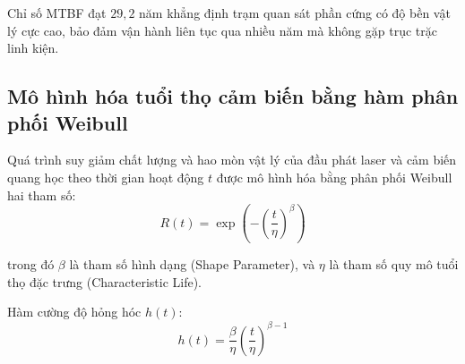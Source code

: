 Chỉ số MTBF đạt $29{,}2$ năm khẳng định trạm quan sát phần cứng có độ bền vật lý cực cao, bảo đảm vận hành liên tục qua nhiều năm mà không gặp trục trặc linh kiện.

\subsection{Mô hình hóa tuổi thọ cảm biến bằng hàm phân phối Weibull}

\hspace{0.5cm} Quá trình suy giảm chất lượng và hao mòn vật lý của đầu phát laser và cảm biến quang học theo thời gian hoạt động $t$ được mô hình hóa bằng phân phối Weibull hai tham số:
\begin{equation}
R(t) = \exp\left( - \left( \frac{t}{\eta} \right)^\beta \right)
\label{eq:weibull-reliability-formula}
\end{equation}

trong đó $\beta$ là tham số hình dạng (Shape Parameter), và $\eta$ là tham số quy mô tuổi thọ đặc trưng (Characteristic Life).

Hàm cường độ hỏng hóc $h(t)$:
\begin{equation}
h(t) = \frac{\beta}{\eta} \left( \frac{t}{\eta} \right)^{\beta - 1}
\label{eq:weibull-hazard-rate-formula}
\end{equation}

\begin{table}[H]
\centering
\caption{Tham số phân phối Weibull và tuổi thọ hoạt động của các kênh cảm biến}
\label{tab:weibull-sensor-parameters}
\end{table}

